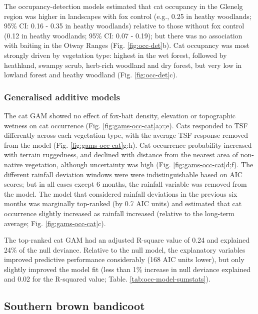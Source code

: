 \documentclass[11pt,a4paper,titlepage,twoside,openright]{style/unimelbthesis}
\begin{document}
\begin{mainmatter}
The occupancy-detection models estimated that cat occupancy in the Glenelg region was higher in landscapes with fox control (e.g., 0.25 in heathy woodlands; 95\% CI: 0.16 - 0.35 in heathy woodlands) relative to those without fox control (0.12 in heathy woodlands; 95\% CI: 0.07 - 0.19); but there was no association with baiting in the Otway Ranges (Fig. \ref{fig:occ-det}b). Cat occupancy was most strongly driven by vegetation type: highest in the wet forest, followed by heathland, swampy scrub, herb-rich woodland and dry forest, but very low in lowland forest and heathy woodland (Fig. \ref{fig:occ-det}c).

\hypertarget{generalised-additive-models-2}{%
\subsubsection{Generalised additive models}\label{generalised-additive-models-2}}

The cat GAM showed no effect of fox-bait density, elevation or topographic wetness on cat occurrence (Fig. \ref{fig:gams-occ-cat}a;c;e). Cats responded to TSF differently across each vegetation type, with the average TSF response removed from the model (Fig. \ref{fig:gams-occ-cat}g:h). Cat occurrence probability increased with terrain ruggedness, and declined with distance from the nearest area of non-native vegetation, although uncertainty was high (Fig. \ref{fig:gams-occ-cat}d;f). The different rainfall deviation windows were were indistinguishable based on AIC scores; but in all cases except 6 months, the rainfall variable was removed from the model. The model that considered rainfall deviations in the previous six months was marginally top-ranked (by 0.7 AIC units) and estimated that cat occurrence slightly increased as rainfall increased (relative to the long-term average; Fig. \ref{fig:gams-occ-cat}c).

The top-ranked cat GAM had an adjusted R-square value of 0.24 and explained 24\% of the null deviance. Relative to the null model, the explanatory variables improved predictive performance considerably (168 AIC units lower), but only slightly improved the model fit (less than 1\% increase in null deviance explained and 0.02 for the R-squared value; Table. \ref{tab:occ-model-sumstats}).

\hypertarget{southern-brown-bandicoot-1}{%
\subsection{Southern brown bandicoot}\label{southern-brown-bandicoot-1}}


\end{mainmatter}
\end{document}
